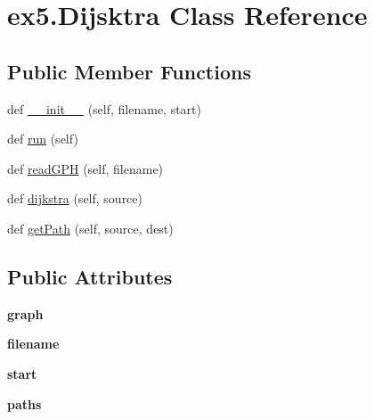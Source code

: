 \hypertarget{classex5_1_1Dijsktra}{}\section{ex5.\+Dijsktra Class Reference}
\label{classex5_1_1Dijsktra}
\subsection*{Public Member Functions}
\begin{DoxyCompactItemize}
\item 
def \hyperlink{classex5_1_1Dijsktra_a35f98850beb55ca51eaa52f4372c9624}{\+\_\+\+\_\+init\+\_\+\+\_\+} (self, filename, start)
\item 
def \hyperlink{classex5_1_1Dijsktra_aea7ae3d54e417bfbae33810b4af4b43f}{run} (self)
\item 
def \hyperlink{classex5_1_1Dijsktra_a18db63176ac6b4f62a9cdf065ae12059}{read\+G\+PH} (self, filename)
\item 
def \hyperlink{classex5_1_1Dijsktra_aee756193b4ffa1f19d0d815c382e9f5c}{dijkstra} (self, source)
\item 
def \hyperlink{classex5_1_1Dijsktra_ac7a2651336adf722eb4ce920736d2ff1}{get\+Path} (self, source, dest)
\end{DoxyCompactItemize}
\subsection*{Public Attributes}
\begin{DoxyCompactItemize}
\item 
{\bfseries graph}\hypertarget{classex5_1_1Dijsktra_a83705e1cb604286451ba4da61b409c12}{}\label{classex5_1_1Dijsktra_a83705e1cb604286451ba4da61b409c12}

\item 
{\bfseries filename}\hypertarget{classex5_1_1Dijsktra_a8dbe32a7b317f625e654e87934e5200d}{}\label{classex5_1_1Dijsktra_a8dbe32a7b317f625e654e87934e5200d}

\item 
{\bfseries start}\hypertarget{classex5_1_1Dijsktra_a49d81cee4303a19a8c88e556ef6f5220}{}\label{classex5_1_1Dijsktra_a49d81cee4303a19a8c88e556ef6f5220}

\item 
{\bfseries paths}\hypertarget{classex5_1_1Dijsktra_a8f901f6dee7ce81c439c4752b9947164}{}\label{classex5_1_1Dijsktra_a8f901f6dee7ce81c439c4752b9947164}

\end{DoxyCompactItemize}



